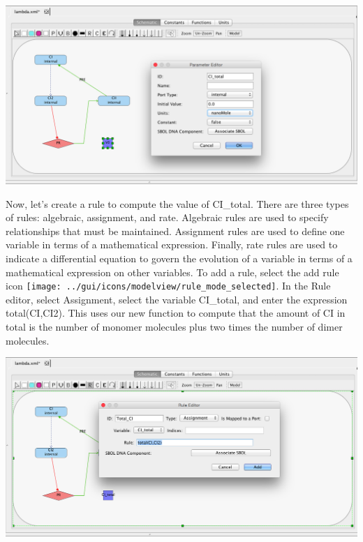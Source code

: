 \documentclass[titlepage,11pt]{article}
\begin{document}
\begin{center}
\includegraphics[width=160mm]{screenshots/parameter}
\end{center}



Now, let's create a rule to compute the value of CI\_total.  There are three types of rules: algebraic, assignment, and rate.  Algebraic rules are used to specify relationships that must be maintained.  Assignment rules are used to define one variable in terms of a mathematical expression.  Finally, rate rules are used to indicate a differential equation to govern the evolution of a variable in terms of a mathematical expression on other variables.  To add a rule, select the add rule icon
\texttt{[image: ../gui/icons/modelview/rule\_mode\_selected]}.  In the Rule editor, 
select Assignment, select the variable CI\_total, and enter the expression total(CI,CI2).  This uses our new function to compute that the amount of CI in total is the number of monomer molecules plus two times the number of dimer molecules.

\begin{center}
\includegraphics[width=160mm]{screenshots/rule}
\end{center}
\end{document}
